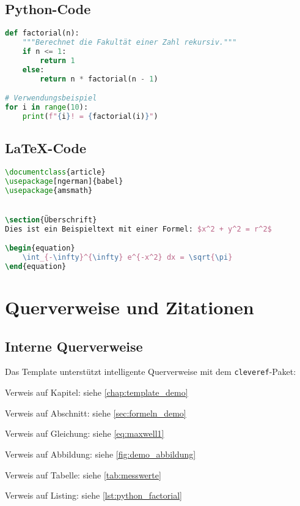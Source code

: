 \subsection{Python-Code}
\label{subsec:python_code}

\begin{lstlisting}[caption={Python-Beispiel: Fakultätsfunktion},label={lst:python_factorial},language=Python]
def factorial(n):
    """Berechnet die Fakultät einer Zahl rekursiv."""
    if n <= 1:
        return 1
    else:
        return n * factorial(n - 1)

# Verwendungsbeispiel
for i in range(10):
    print(f"{i}! = {factorial(i)}")
\end{lstlisting}

\subsection{LaTeX-Code}
\label{subsec:latex_code}

\begin{lstlisting}[caption={LaTeX-Beispiel: Dokumentstruktur},label={lst:latex_example},language=TeX]
\documentclass{article}
\usepackage[ngerman]{babel}
\usepackage{amsmath}


\section{Überschrift}
Dies ist ein Beispieltext mit einer Formel: $x^2 + y^2 = r^2$

\begin{equation}
    \int_{-\infty}^{\infty} e^{-x^2} dx = \sqrt{\pi}
\end{equation}

\end{lstlisting}

\section{Querverweise und Zitationen}
\label{sec:querverweise}

\subsection{Interne Querverweise}
\label{subsec:querverweise_intern}

Das Template unterstützt intelligente Querverweise mit dem \texttt{cleveref}-Paket:
\begin{listenabsatz}
	\item Verweis auf Kapitel: siehe \cref{chap:template_demo}
	\item Verweis auf Abschnitt: siehe \cref{sec:formeln_demo}
	\item Verweis auf Gleichung: siehe \cref{eq:maxwell1}
	\item Verweis auf Abbildung: siehe \cref{fig:demo_abbildung}
	\item Verweis auf Tabelle: siehe \cref{tab:messwerte}
	\item Verweis auf Listing: siehe \cref{lst:python_factorial}
\end{listenabsatz}

